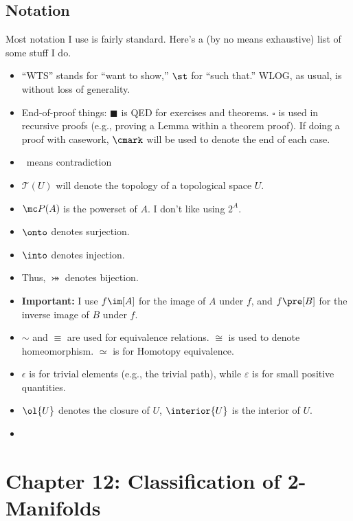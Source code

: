 \documentclass{fkbook}
\begin{document}
\section*{Notation}
Most notation I use is fairly standard. Here's a (by no means exhaustive) list
of some stuff I do.
\begin{itemize}
  \item ``WTS'' stands for ``want to show,'' $\st$ for ``such that.'' WLOG, as
    usual, is without loss of generality.
  \item End-of-proof things: $\blacksquare$ is QED for exercises and theorems.
    $\square$ is used in recursive proofs (e.g., proving a Lemma within a
    theorem proof). If doing a proof with casework, $\cmark$ will be used to
    denote the end of each case.
  \item \contra\ means contradiction
  \item $\mathscr{T}(U)$ will denote the topology of a topological space $U$.
  \item $\mc P(A)$ is the powerset of $A$. I don't like using $2^A$.
  \item $\onto$ denotes surjection.
  \item $\into$ denotes injection.
  \item Thus, $\bij$ denotes bijection.
  \item \textbf{Important:} I use $f\im[A]$ for the image of $A$ under $f$, and
    $f\pre[B]$ for the inverse image of $B$ under $f$.
  \item $\sim$ and $\equiv$ are used for equivalence relations. $\cong$ is used
    to denote homeomorphism. $\simeq$ is for Homotopy equivalence.
  \item $\epsilon$ is for trivial elements (e.g., the trivial path), while
    $\varepsilon$ is for small positive quantities.
  \item $\ol{U}$ denotes the closure of $U$, $\interior{U}$ is the interior of
    $U$.
  \item
\end{itemize}

\mainmatter
\pagestyle{main}
\chapter{Chapter 12: Classification of 2-Manifolds}
\end{document}
